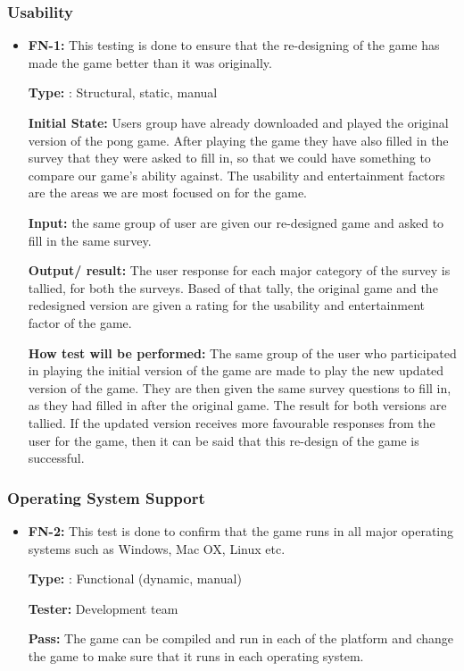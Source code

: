 \documentclass[12pt,letterpaper]{article}
\begin{document}
	\subsubsection{Usability}
\begin{reqbox}
	\begin{itemize}
	\item \textbf{FN-1: }This testing is done to ensure that the re-designing of the game has made the game better than it was originally.

	\textbf{Type: }: Structural, static, manual

	\textbf{Initial State: } Users group have already downloaded and played the original version of the pong game. After playing the game they have also filled in the survey that they were asked to fill in, so that we could have something to compare our game’s ability against. The usability and entertainment factors are the areas we are most focused on for the game.

	\textbf{Input: } the same group of user are given our re-designed game and asked to fill in the same survey.

	\textbf{Output/ result: }The user response for each major category of the survey is tallied, for both the surveys. Based of that tally, the original game and the redesigned version are given a rating for the usability and entertainment factor of the game. 

	\textbf{How test will be performed: }The same group of the user who participated in playing the initial version of the game are made to play the new updated version of the game. They are then given the same survey questions to fill in, as they had filled in after the original game. The result for both versions are tallied. If the updated version receives more favourable responses from the user for the game, then it can be said that this re-design of the game is successful.  
	\end{itemize}
\end{reqbox}

	\subsubsection{Operating System Support}
\begin{reqbox}
	\begin{itemize}	
	\item \textbf{FN-2: }This test is done to confirm that the game runs in all major operating systems such as Windows, Mac OX, Linux etc. 

	\textbf{Type: }: Functional (dynamic, manual)

	\textbf{Tester:  }Development team
	
	\textbf{Pass: }The game can be compiled and run in each of the platform and change the game to make sure that it runs in each operating system.
	\end{itemize}
\end{reqbox}
\end{document}
